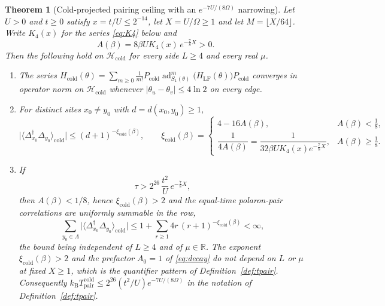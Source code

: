 \documentclass[11pt]{article}
\theoremstyle{plain}
\newtheorem{theorem}{Theorem}
\theoremstyle{definition}
\newcommand{\Dop}{\Delta}
\newcommand{\ad}{\operatorname{ad}}
\begin{document}
\begin{theorem}[Cold-projected pairing ceiling with an $e^{-7U/(8\Omega)}$
narrowing]\label{thm:main}
Let $U>0$ and $t\ge0$ satisfy $x=t/U\le2^{-14}$, let $X=U/\Omega\ge1$ and let
$M=\lfloor X/64\rfloor$. Write $K_4(x)$ for the series \eqref{eq:K4} below and
\begin{equation}\label{eq:A}
A(\beta)=8\beta U K_4(x)\,e^{-\frac{7}{8}X}>0 .
\end{equation}
Then the following hold on $\mathcal{H}_{\mathrm{cold}}$ for every side
$L\ge4$ and every real $\mu$.
\begin{enumerate}
\item\label{it:bch} The series
$H_{\mathrm{cold}}(\theta)=\sum_{m\ge0}\frac{1}{m!}P_{\mathrm{cold}}\ad_{S_1(\theta)}^{m}\bigl(H_{\mathrm{LF}}(\theta)\bigr)P_{\mathrm{cold}}$
converges in operator norm on $\mathcal{H}_{\mathrm{cold}}$ whenever
$|\theta_u-\theta_v|\le4\ln2$ on every edge.
\item\label{it:decay} For distinct sites $x_0\ne y_0$ with $d=d(x_0,y_0)\ge1$,
\begin{equation}\label{eq:decay}
\bigl|\langle\Dop_{x_0}^\dagger\Dop_{y_0}\rangle_{\mathrm{cold}}\bigr|
\le(d+1)^{-\xi_{\mathrm{cold}}(\beta)},\qquad
\xi_{\mathrm{cold}}(\beta)=
\begin{cases}
4-16A(\beta), & A(\beta)<\tfrac18,\\[2pt]
\dfrac{1}{4A(\beta)}=\dfrac{1}{32\beta UK_4(x)e^{-\frac{7}{8}X}}, & A(\beta)\ge\tfrac18 .
\end{cases}
\end{equation}
\item\label{it:ceiling} If
\begin{equation}\label{eq:ceiling}
\tau>2^{26}\,\frac{t^{2}}{U}\,e^{-\frac{7}{8}X},
\end{equation}
then $A(\beta)<1/8$, hence $\xi_{\mathrm{cold}}(\beta)>2$ and the equal-time
polaron-pair correlations are uniformly summable in the row,
\begin{equation}\label{eq:summ}
\sum_{y_0\in\Lambda}\bigl|\langle\Dop_{x_0}^\dagger\Dop_{y_0}\rangle_{\mathrm{cold}}\bigr|
\le1+\sum_{r\ge1}4r\,(r+1)^{-\xi_{\mathrm{cold}}(\beta)}<\infty ,
\end{equation}
the bound being independent of $L\ge4$ and of $\mu\in\mathbb{R}$. The exponent
$\xi_{\mathrm{cold}}(\beta)>2$ and the prefactor $A_0=1$ of \eqref{eq:decay} do
not depend on $L$ or $\mu$ at fixed $X\ge1$, which is the quantifier pattern of
Definition~\ref{def:tpair}. Consequently
$k_{\mathrm{B}}T^{\mathrm{cold}}_{\mathrm{pair}}\le2^{26}(t^{2}/U)e^{-7U/(8\Omega)}$
in the notation of Definition~\ref{def:tpair}.
\end{enumerate}
\end{theorem}
\end{document}
